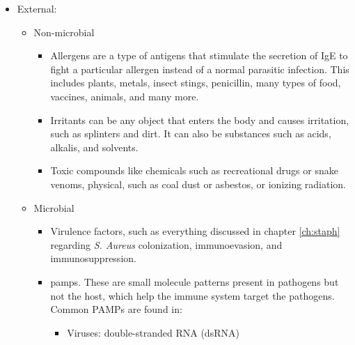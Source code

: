 \begin{itemize}

    \item {External:}

        \begin{itemize}
    
            \item{Non-microbial}

                \begin{itemize}
            
                    \item {Allergens} are a type of antigens that stimulate the secretion of IgE to fight a particular allergen instead of a normal parasitic infection. This includes plants, metals, insect stings, penicillin, many types of food, vaccines, animals, and many more.
                    
                    \item {Irritants} can be any object that enters the body and causes irritation, such as splinters and dirt. It can also be substances such as acids, alkalis, and solvents.
                    
                    \item {Toxic compounds} like chemicals such as recreational drugs or snake venoms, physical, such as coal dust or asbestos, or ionizing radiation.
    
                \end{itemize}
            
            \item{Microbial}

                \begin{itemize}
            
                    \item{Virulence factors}, such as everything discussed in chapter \ref{ch:staph} regarding \textit{S. Aureus} colonization, immunoevasion, and immunosuppression.
                    
                    \item{\gls{pamps}}. These are small molecule patterns present in pathogens but not the host, which help the immune system target the pathogens. Common PAMPs are found in:

                        \begin{itemize}
                    
                            \item Viruses: double-stranded RNA (dsRNA)
                            

\end{itemize}
\end{itemize}
\end{itemize}
\end{itemize}
